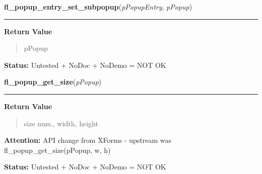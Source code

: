     \label{xformslib:library:fl_popup_entry_set_subpopup}

    \vspace{0.5ex}

\hspace{.8\funcindent}\begin{boxedminipage}{\funcwidth}

    \raggedright \textbf{fl\_popup\_entry\_set\_subpopup}(\textit{pPopupEntry}, \textit{pPopup})

    \vspace{-1.5ex}

    \rule{\textwidth}{0.5\fboxrule}
\setlength{\parskip}{2ex}
\setlength{\parskip}{1ex}
      \textbf{Return Value}
    \vspace{-1ex}

      \begin{quote}
      pPopup

      \end{quote}

\textbf{Status:} Untested + NoDoc + NoDemo = NOT OK



    \end{boxedminipage}

    \label{xformslib:library:fl_popup_get_size}

    \vspace{0.5ex}

\hspace{.8\funcindent}\begin{boxedminipage}{\funcwidth}

    \raggedright \textbf{fl\_popup\_get\_size}(\textit{pPopup})

    \vspace{-1.5ex}

    \rule{\textwidth}{0.5\fboxrule}
\setlength{\parskip}{2ex}
\setlength{\parskip}{1ex}
      \textbf{Return Value}
    \vspace{-1ex}

      \begin{quote}
      size num., width, height

      \end{quote}

\textbf{Attention:} API change from XForms - upstream was fl\_popup\_get\_size(pPopup, w, h)



\textbf{Status:} Untested + NoDoc + NoDemo = NOT OK



    \end{boxedminipage}

